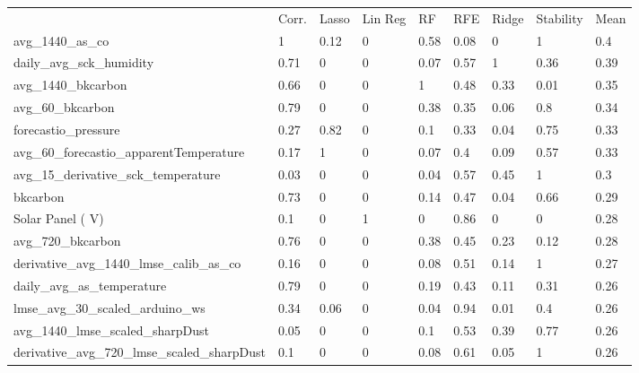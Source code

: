 \begin{table}[!htb]
\centering
\small
\begin{tabular}{lllllllll}
\\
\\
\toprule
     & Corr. & Lasso & Lin Reg & RF   & RFE  & Ridge & Stability & Mean \\
\midrule
avg\_1440\_as\_co                             & 1     & 0.12  & 0          & 0.58 & 0.08 & 0     & 1         & 0.4  \\
daily\_avg\_sck\_humidity                     & 0.71  & 0     & 0          & 0.07 & 0.57 & 1     & 0.36      & 0.39 \\
avg\_1440\_bkcarbon                           & 0.66  & 0     & 0          & 1    & 0.48 & 0.33  & 0.01      & 0.35 \\
avg\_60\_bkcarbon                             & 0.79  & 0     & 0          & 0.38 & 0.35 & 0.06  & 0.8       & 0.34 \\
forecastio\_pressure                          & 0.27  & 0.82  & 0          & 0.1  & 0.33 & 0.04  & 0.75      & 0.33 \\
avg\_60\_forecastio\_apparentTemperature      & 0.17  & 1     & 0          & 0.07 & 0.4  & 0.09  & 0.57      & 0.33 \\
avg\_15\_derivative\_sck\_temperature         & 0.03  & 0     & 0          & 0.04 & 0.57 & 0.45  & 1         & 0.3  \\
bkcarbon                                      & 0.73  & 0     & 0          & 0.14 & 0.47 & 0.04  & 0.66      & 0.29 \\
Solar Panel ( V)                              & 0.1   & 0     & 1          & 0    & 0.86 & 0     & 0         & 0.28 \\
avg\_720\_bkcarbon                            & 0.76  & 0     & 0          & 0.38 & 0.45 & 0.23  & 0.12      & 0.28 \\
derivative\_avg\_1440\_lmse\_calib\_as\_co    & 0.16  & 0     & 0          & 0.08 & 0.51 & 0.14  & 1         & 0.27 \\
daily\_avg\_as\_temperature                   & 0.79  & 0     & 0          & 0.19 & 0.43 & 0.11  & 0.31      & 0.26 \\
lmse\_avg\_30\_scaled\_arduino\_ws            & 0.34  & 0.06  & 0          & 0.04 & 0.94 & 0.01  & 0.4       & 0.26 \\
avg\_1440\_lmse\_scaled\_sharpDust            & 0.05  & 0     & 0          & 0.1  & 0.53 & 0.39  & 0.77      & 0.26 \\
derivative\_avg\_720\_lmse\_scaled\_sharpDust & 0.1   & 0     & 0          & 0.08 & 0.61 & 0.05  & 1         & 0.26 \\

\end{tabular}
\end{table}
